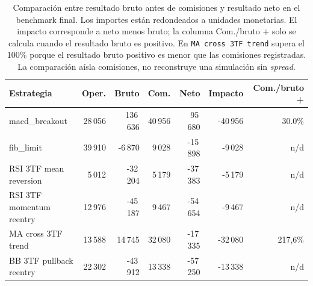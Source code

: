 \begin{table}[H]
\centering
\scriptsize
\setlength{\tabcolsep}{3pt}
\begin{tabular}{lrrrrrr}
\hline
Estrategia & Oper. & Bruto & Com. & Neto & Impacto & Com./bruto + \\
\hline
macd\_breakout & 28\,056 & 136\,636 & 40\,956 & 95\,680 & -40\,956 & 30.0\% \\
fib\_limit & 39\,910 & -6\,870 & 9\,028 & -15\,898 & -9\,028 & n/d \\
RSI 3TF mean reversion & 5\,012 & -32\,204 & 5\,179 & -37\,383 & -5\,179 & n/d \\
RSI 3TF momentum reentry & 12\,976 & -45\,187 & 9\,467 & -54\,654 & -9\,467 & n/d \\
MA cross 3TF trend & 13\,588 & 14\,745 & 32\,080 & -17\,335 & -32\,080 & 217,6\% \\
BB 3TF pullback reentry & 22\,302 & -43\,912 & 13\,338 & -57\,250 & -13\,338 & n/d \\
\hline
\end{tabular}
\caption[Costes de transacci\'on en el benchmark final]{Comparaci\'on entre resultado bruto antes de comisiones y resultado neto en el benchmark final. Los importes est\'an redondeados a unidades monetarias. El impacto corresponde a neto menos bruto; la columna Com./bruto + solo se calcula cuando el resultado bruto es positivo. En \texttt{MA cross 3TF trend} supera el 100\% porque el resultado bruto positivo es menor que las comisiones registradas. La comparaci\'on a\'isla comisiones, no reconstruye una simulaci\'on sin \textit{spread}.}
\label{tab:benchmark-w2-costes-bruto-neto}
\end{table}
